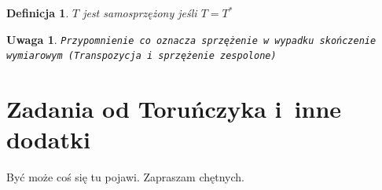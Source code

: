 \documentclass[11pt]{mwrep}
\renewcommand{\[}{\begin{equation}}
\renewcommand{\]}{\end{equation}}
\newtheorem{uwaga}[subsection]{Uwaga}
\newtheorem{de}[subsection]{Definicja}
\begin{document}
\begin{de}
	$T$ jest samosprzężony jeśli $T= T^*$ 
\end{de}
\begin{uwaga}
	\texttt{Przypomnienie co oznacza sprzężenie w~wypadku skończenie wymiarowym (Transpozycja i~sprzężenie zespolone)}
\end{uwaga}
\chapter{Zadania od Toruńczyka i~inne dodatki}
Być może coś się tu pojawi. Zapraszam chętnych. 
\newpage
\end{document}
